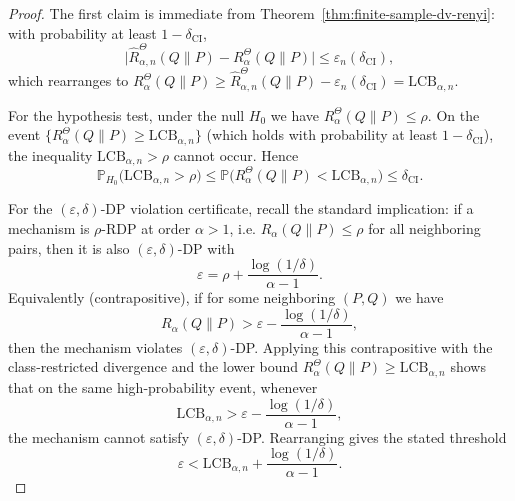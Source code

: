 \documentclass{article}
\theoremstyle{plain}
\theoremstyle{definition}
\theoremstyle{remark}
\begin{document}
\begin{proof}
The first claim is immediate from Theorem~\ref{thm:finite-sample-dv-renyi}:
with probability at least $1-\delta_{\mathrm{CI}}$,
\[
\big|\widehat R_{\alpha,n}^{\Theta}(Q\|P)-R_\alpha^{\Theta}(Q\|P)\big|
\le \varepsilon_n(\delta_{\mathrm{CI}}),
\]
which rearranges to
$R_\alpha^{\Theta}(Q\|P)\ge \widehat R_{\alpha,n}^{\Theta}(Q\|P)-\varepsilon_n(\delta_{\mathrm{CI}})
=\mathrm{LCB}_{\alpha,n}$.

For the hypothesis test, under the null $H_0$ we have
$R_\alpha^{\Theta}(Q\|P)\le \rho$.
On the event $\{R_\alpha^{\Theta}(Q\|P)\ge \mathrm{LCB}_{\alpha,n}\}$ (which holds with
probability at least $1-\delta_{\mathrm{CI}}$),
the inequality $\mathrm{LCB}_{\alpha,n}>\rho$ cannot occur.
Hence
\[
\mathbb{P}_{H_0}\big(\mathrm{LCB}_{\alpha,n}>\rho\big)
\le
\mathbb{P}\big(R_\alpha^{\Theta}(Q\|P)< \mathrm{LCB}_{\alpha,n}\big)
\le \delta_{\mathrm{CI}}.
\]

For the $(\varepsilon,\delta)$-DP violation certificate, recall the standard implication:
if a mechanism is $\rho$-RDP at order $\alpha>1$, i.e.
$R_\alpha(Q\|P)\le \rho$ for all neighboring pairs, then it is also
$(\varepsilon,\delta)$-DP with
\[
\varepsilon = \rho + \frac{\log(1/\delta)}{\alpha-1}.
\]
Equivalently (contrapositive), if for some neighboring $(P,Q)$ we have
\[
R_\alpha(Q\|P) > \varepsilon - \frac{\log(1/\delta)}{\alpha-1},
\]
then the mechanism violates $(\varepsilon,\delta)$-DP.
Applying this contrapositive with the class-restricted divergence and the lower bound
$R_\alpha^{\Theta}(Q\|P)\ge \mathrm{LCB}_{\alpha,n}$ shows that on the same high-probability
event, whenever
\[
\mathrm{LCB}_{\alpha,n} > \varepsilon - \frac{\log(1/\delta)}{\alpha-1},
\]
the mechanism cannot satisfy $(\varepsilon,\delta)$-DP.
Rearranging gives the stated threshold
\[
\varepsilon < \mathrm{LCB}_{\alpha,n} + \frac{\log(1/\delta)}{\alpha-1}.
\]
\end{proof}
\end{document}
